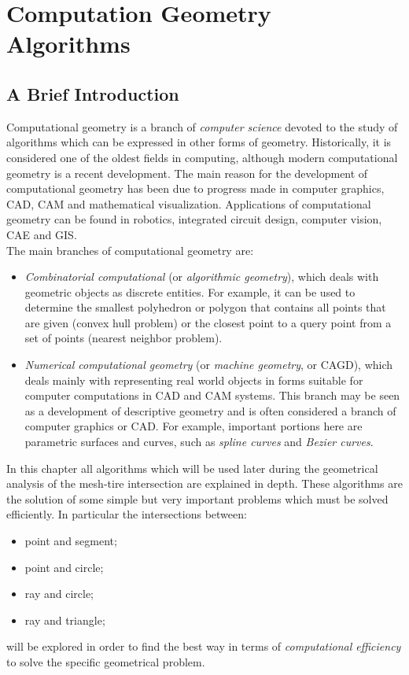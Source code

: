 \chapter{Computation Geometry Algorithms}
\label{Geom_Algos}
%
\section{A Brief Introduction}
Computational geometry is a branch of \textit{computer science} devoted to the study of algorithms which can be expressed in other forms of geometry. Historically, it is considered one of the oldest fields in computing, although modern computational geometry is a recent development. The main reason for the development of computational geometry has been due to progress made in computer graphics, \ac{CAD}, \ac{CAM} and mathematical visualization. Applications of computational geometry can be found in robotics, integrated circuit design, computer vision, \ac{CAE} and \ac{GIS}.\\
The main branches of computational geometry are:
\begin{itemize}
	\item \textit{Combinatorial computational} (or \textit{algorithmic geometry}), which deals with geometric objects as discrete entities. For example, it can be used to determine the smallest polyhedron or polygon that contains all points that are given (convex hull problem) or the closest point to a query point from a set of points (nearest neighbor problem).
	\item \textit{Numerical computational geometry} (or \textit{machine geometry}, or \ac{CAGD}), which deals mainly with representing real world objects in forms suitable for computer computations in \ac{CAD} and \ac{CAM} systems. This branch may be seen as a development of descriptive geometry and is often considered a branch of computer graphics or \ac{CAD}. For example, important portions here are parametric surfaces and curves, such as \textit{spline curves} and \textit{Bezier curves}.
\end{itemize}
In this chapter all algorithms which will be used later during the geometrical analysis of the mesh-tire intersection are explained in depth. These algorithms are the solution of some simple but very important problems which must be solved efficiently. In particular the intersections between:
\begin{itemize}
	\item point and segment;
	\item point and circle;
	\item ray and circle;
	\item ray and triangle;
\end{itemize}
will be explored in order to find the best way in terms of \textit{computational efficiency} to solve the specific geometrical problem.
%
